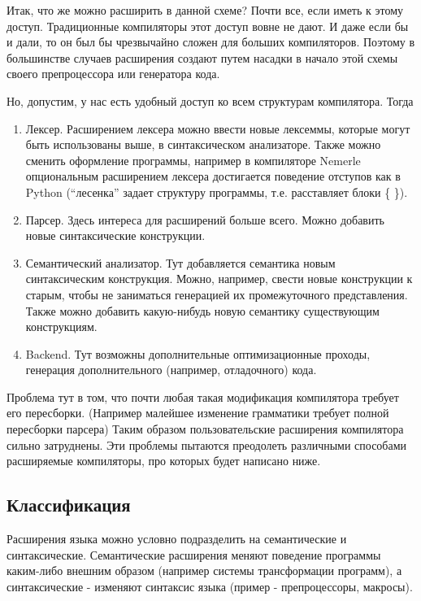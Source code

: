 \documentclass[a4paper,12pt]{article}
\begin{document}
Итак, что же можно расширить в данной схеме? Почти все, если иметь к этому
доступ. Традиционные компиляторы этот доступ вовне не дают. И даже если бы и
дали, то он был бы чрезвычайно сложен для больших компиляторов.
Поэтому в большинстве случаев расширения создают путем насадки в начало этой
схемы своего препроцессора или генератора кода.

Но, допустим, у нас есть удобный доступ ко всем структурам компилятора. Тогда

\begin{enumerate}
  \item Лексер. Расширением лексера можно ввести новые лексеммы, которые могут
  быть использованы выше, в синтаксическом анализаторе. Также можно сменить
  оформление программы, например в компиляторе Nemerle опциональным расширением
  лексера достигается поведение отступов как в Python (``лесенка'' задает
  структуру программы, т.е. расставляет блоки \{ \}).
  \item Парсер. Здесь интереса для расширений больше всего. Можно добавить
  новые синтаксические конструкции.
  \item Семантический анализатор. Тут добавляется семантика новым
  синтаксическим конструкция. Можно, например, свести новые конструкции к
  старым, чтобы не заниматься генерацией их промежуточного представления.
  Также можно добавить какую-нибудь новую семантику существующим конструкциям.
  \item Backend. Тут возможны дополнительные оптимизационные проходы, генерация
  дополнительного (например, отладочного) кода.
\end{enumerate}
Проблема тут в том, что почти любая такая модификация компилятора требует его
пересборки. (Например малейшее изменение грамматики требует полной пересборки
парсера) Таким образом пользовательские расширения компилятора сильно
затруднены. Эти проблемы пытаются преодолеть различными способами расширяемые
компиляторы, про которых будет написано ниже.

\subsection{Классификация}

Расширения языка можно условно подразделить на семантические и синтаксические.
Семантические расширения меняют поведение программы каким-либо внешним образом
(например системы трансформации программ), а синтаксические - изменяют синтаксис
языка (пример - препроцессоры, макросы).
\end{document}
